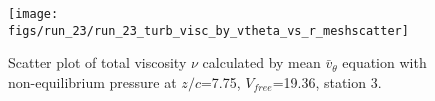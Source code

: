 \begin{figure}[H]
\centering
\texttt{[image: figs/run\_23/run\_23\_turb\_visc\_by\_vtheta\_vs\_r\_meshscatter]}
\caption{Scatter plot of total viscosity $\nu$ calculated by mean $\bar{v}_{\theta}$ equation with non-equilibrium pressure at $z/c$=7.75, $V_{free}$=19.36, station 3.}
\label{fig:run_23_turb_visc_by_vtheta_vs_r_meshscatter}
\end{figure}


